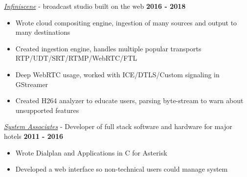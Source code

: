 \documentclass{res}
\begin{document}
\begin{resume}
\href{https://infiniscene.com/}{{\it Infiniscene}} - broadcast studio built on the web \hfill {\bf 2016 - 2018}
\begin{itemize}  \itemsep -2pt
    \item Wrote cloud compositing engine, ingestion of many sources and output to many destinations
    \item Created ingestion engine, handles multiple popular transports RTP/UDT/SRT/RTMP/WebRTC/FTL
    \item Deep WebRTC usage, worked with ICE/DTLS/Custom signaling in GStreamer
    \item Created H264 analyzer to educate users, parsing byte-stream to warn about unsupported features
\end{itemize}

\href{http://www.saicorporate.com}{{\it System Associates}} - Developer of full stack software and hardware for major hotels {\bf \hfill 2011 - 2016 }
\begin{itemize}  \itemsep -2pt
    \item Wrote Dialplan and Applications in C for Asterisk
    \item Developed a web interface so non-technical users could manage system
\end{itemize}


\end{resume}
\end{document}
